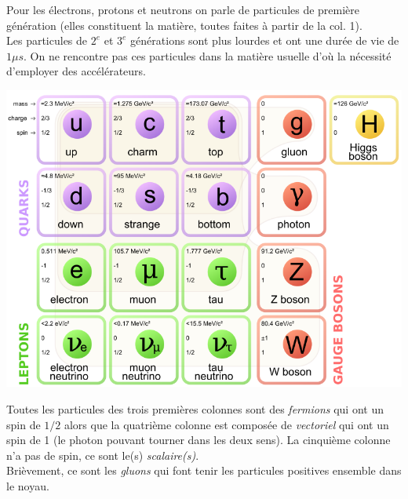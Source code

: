 \documentclass	[11pt, a4paper, openany]{book}
\begin{document}
	Pour les électrons, protons et neutrons on parle de particules de première génération (elles constituent la matière, toutes faites à partir de la col. 1).\\
	Les particules de $2^e$ et $3^e$ générations sont plus lourdes et ont une durée de vie de $1 \mu s$. On ne rencontre pas ces particules dans la matière usuelle d'où la nécessité d'employer des accélérateurs.\\
	\begin{center}
		\includegraphics[scale=0.25]{img/particulelem}
	\end{center}
	Toutes les particules des trois premières colonnes sont des \textit{fermions} qui ont un spin de $1/2$ alors que la quatrième colonne est composée de \textit{vectoriel} qui ont un spin de 1 (le photon pouvant tourner dans les deux sens). La cinquième colonne n'a pas de spin, ce sont le(s) \textit{scalaire(s)}.\\
	Brièvement, ce sont les \textit{gluons} qui font tenir les particules positives ensemble dans le noyau.
	
\end{document}
